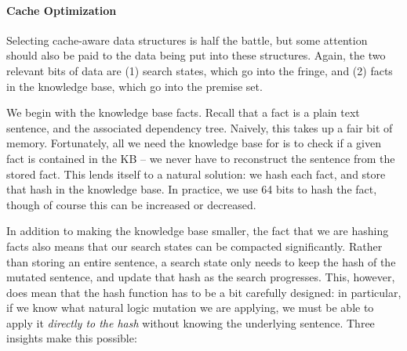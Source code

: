 \paragraph{Cache Optimization}
Selecting cache-aware data structures is half the battle, but some attention should also be
  paid to the data being put into these structures.
Again, the two relevant bits of data are (1) search states, which go into the fringe, and
  (2) facts in the knowledge base, which go into the premise set.

We begin with the knowledge base facts.
Recall that a fact is a plain text sentence, and the associated dependency tree.
Naively, this takes up a fair bit of memory.
Fortunately, all we need the knowledge base for is to check if a given fact is contained
  in the KB -- we never have to reconstruct the sentence from the stored fact.
This lends itself to a natural solution: we hash each fact, and store that hash in the
  knowledge base.
In practice, we use 64 bits to hash the fact, though of course this can be increased or
  decreased.

In addition to making the knowledge base smaller, the fact that we are hashing facts
  also means that our search states can be compacted significantly.
Rather than storing an entire sentence, a search state only needs to keep the hash of the
  mutated sentence, and update that hash as the search progresses.
This, however, does mean that the hash function has to be a bit carefully designed:
  in particular, if we know what natural logic mutation we are applying, we must be able to
  apply it \textit{directly to the hash} without knowing the underlying sentence.
Three insights make this possible:

